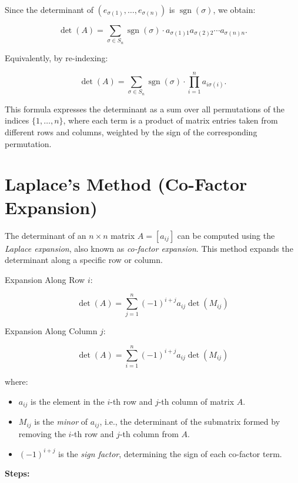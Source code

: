 Since the determinant of \( (e_{\sigma(1)}, \dots, e_{\sigma(n)}) \) is \( \operatorname{sgn}(\sigma) \), we obtain:

\[
    \det(A) = \sum_{\sigma \in S_n} \operatorname{sgn}(\sigma) \cdot a_{\sigma(1)1} a_{\sigma(2)2} \cdots a_{\sigma(n)n}.
\]

Equivalently, by re-indexing:

\[
    \det(A) = \sum_{\sigma \in S_n} \operatorname{sgn}(\sigma) \cdot \prod_{i=1}^n a_{i \sigma(i)}.
\]

This formula expresses the determinant as a sum over all permutations of the indices \( \{1, \dots, n\} \), where each term is a 
product of matrix entries taken from different rows and columns, weighted by the sign of the corresponding permutation.

\section{Laplace's Method (Co-Factor Expansion)}

The determinant of an \( n \times n \) matrix \( A = [a_{ij}] \) can be computed using the \emph{Laplace expansion}, also known as \emph{co-factor expansion}.
This method expands the determinant along a specific row or column.

Expansion Along Row \(i\):

\[
    \det(A) = \sum_{j=1}^{n} {(-1)}^{i+j} a_{ij} \det(M_{ij})
\]

Expansion Along Column \(j\):

\[
    \det(A) = \sum_{i=1}^{n} {(-1)}^{i+j} a_{ij} \det(M_{ij})
\]

where:

\begin{itemize}

    \item \( a_{ij} \) is the element in the \(i\)-th row and \(j\)-th column of matrix \(A\).

    \item \( M_{ij} \) is the \emph{minor} of \( a_{ij} \), i.e., the determinant of the submatrix formed by removing the \(i\)-th row and \(j\)-th 
    column from \(A\).

    \item \( {(-1)}^{i+j} \) is the \emph{sign factor}, determining the sign of each co-factor term.

\end{itemize}

\textbf{Steps:}


